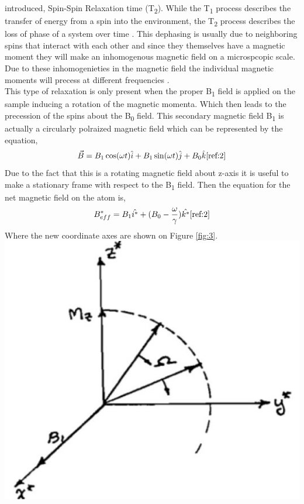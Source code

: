\documentclass{article}
\begin{document}
{\begin{multicols}{2}
introduced, Spin-Spin Relaxation time (T\textsubscript{2}). While the 
T\textsubscript{1} process describes the transfer of energy from a spin into 
the environment, the T\textsubscript{2} process describes the loss of phase of 
a system over time \cite{ref:3}. This dephasing is usually due to 
neighboring spins that interact with each other and since they themselves have 
a magnetic moment they will make an inhomogenous magnetic field on a 
microspcopic scale. Due to these inhomogenieties in the magnetic field the 
individual magnetic moments will precess at different frequencies \cite{ref:1}.
\\
This type of relaxation is only present when the proper B\textsubscript{1} 
field is applied on the sample inducing a rotation of the magnetic momenta. 
Which then leads to the precession of the spins about the B\textsubscript{0} 
field. This secondary magnetic field B\textsubscript{1} is actually a 
circularly polraized magnetic field which can be represented by the equation,
\begin{equation}
\vec{B} = B_1\cos(\omega t)\hat{i} + B_1\sin(\omega t)\hat{j} + B_0 \hat{k}
\label{eqn:10}
\cite{ref:2}
\end{equation}
Due to the fact that this is a rotating magnetic field about z-axis it is 
useful to make a stationary frame with respect to the B\textsubscript{1} field. 
Then the equation for the net magnetic field on the atom is,
\begin{equation}
B_{eff}^{*} = B_1 \hat{i^*} + (B_0 -\frac{\omega}{\gamma})\hat{k^*}
\label{eqn:11}
\cite{ref:2}
\end{equation}
Where the new coordinate axes are shown on Figure \ref{fig:3}.
\center
\includegraphics[width=\linewidth]{pic-de-manual/rotacion-de-coordenadas.jpg}

\end{multicols}}
\end{document}
